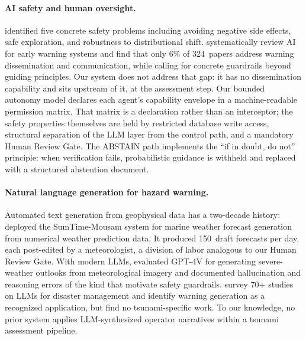 \documentclass{article}
\begin{document}
\paragraph{AI safety and human oversight.}
\citet{amodei2016concrete} identified five concrete safety problems
including avoiding negative side effects, safe exploration, and
robustness to distributional shift. \citet{tiggeloven2025role}
systematically review AI for early warning systems and find that only
6\% of 324~papers address warning dissemination and communication,
while calling for concrete guardrails beyond guiding principles.  Our
system does not address that gap: it has no dissemination capability
and sits upstream of it, at the assessment step. Our bounded autonomy model declares each agent's
capability envelope in a machine-readable permission matrix. That
matrix is a declaration rather than an interceptor; the safety
properties themselves are held by restricted database write access,
structural separation of the LLM layer from the control path, and a
mandatory Human Review Gate. The ABSTAIN path
implements the ``if in doubt, do not'' principle: when verification
fails, probabilistic guidance is withheld and replaced with a
structured abstention document.

\paragraph{Natural language generation for hazard warning.}
Automated text generation from geophysical data has a two-decade
history: \citet{sripada2003sumtime} deployed the SumTime-Mousam
system for marine weather forecast generation from numerical weather
prediction data. It produced 150~draft forecasts per day, each
post-edited by a meteorologist, a division of labor analogous to our
Human Review Gate.  With modern LLMs, \citet{lawson2025pixels}
evaluated GPT-4V for generating severe-weather outlooks from
meteorological imagery and documented hallucination and reasoning
errors of the kind that motivate safety guardrails.
\citet{lei2025harnessing} survey 70+ studies on LLMs for disaster
management and identify warning generation as a recognized application,
but find no tsunami-specific work. To our knowledge, no prior system
applies LLM-synthesized operator narratives within a tsunami
assessment pipeline.

\end{document}
